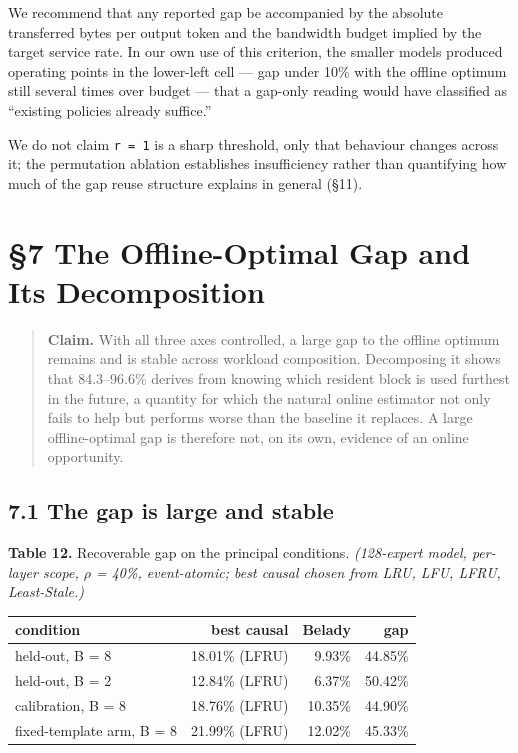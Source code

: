\documentclass[
  10pt,
  letterpaper,
  10pt]{article}
\newcounter{none} %
\begin{document}
We recommend that any reported gap be accompanied by the absolute
transferred bytes per output token and the bandwidth budget implied by
the target service rate. In our own use of this criterion, the smaller
models produced operating points in the lower-left cell --- gap under
10\% with the offline optimum still several times over budget --- that a
gap-only reading would have classified as ``existing policies already
suffice.''

We do not claim \texttt{r\ =\ 1} is a sharp threshold, only that
behaviour changes across it; the permutation ablation establishes
insufficiency rather than quantifying how much of the gap reuse
structure explains in general (§11).

\section{§7 The Offline-Optimal Gap and Its
Decomposition}\label{the-offline-optimal-gap-and-its-decomposition}

\begin{quote}
\textbf{Claim.} With all three axes controlled, a large gap to the
offline optimum remains and is stable across workload composition.
Decomposing it shows that 84.3--96.6\% derives from knowing which
resident block is used furthest in the future, a quantity for which the
natural online estimator not only fails to help but performs worse than
the baseline it replaces. A large offline-optimal gap is therefore not,
on its own, evidence of an online opportunity.
\end{quote}

\subsection{7.1 The gap is large and
stable}\label{the-gap-is-large-and-stable}

\textbf{Table 12.} Recoverable gap on the principal conditions.
\emph{(128-expert model, per-layer scope, \ensuremath{\rho} = 40\%,
event-atomic; best causal chosen from LRU, LFU, LFRU, Least-Stale.)}

{\def\LTcaptype{none} %
\begin{longtable}[]{@{}lrrr@{}}
\toprule\noalign{}
condition & best causal & Belady & gap \\
\midrule\noalign{}
\endhead
\bottomrule\noalign{}
\endlastfoot
held-out, B = 8 & 18.01\% (LFRU) & 9.93\% & 44.85\% \\
held-out, B = 2 & 12.84\% (LFRU) & 6.37\% & 50.42\% \\
calibration, B = 8 & 18.76\% (LFRU) & 10.35\% & 44.90\% \\
fixed-template arm, B = 8 & 21.99\% (LFRU) & 12.02\% & 45.33\% \\
\end{longtable}
}
\end{document}
